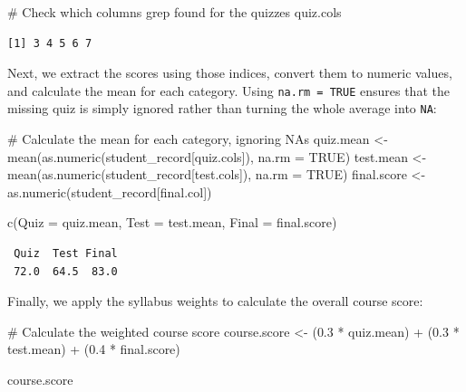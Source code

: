 \documentclass[
  letterpaper,
  DIV=11,
  numbers=noendperiod]{scrreprt}
\newenvironment{Shaded}{\begin{snugshade}}{\end{snugshade}}
\newcommand{\AttributeTok}[1]{\textcolor[rgb]{0.40,0.45,0.13}{#1}}
\newcommand{\CommentTok}[1]{\textcolor[rgb]{0.37,0.37,0.37}{#1}}
\newcommand{\ConstantTok}[1]{\textcolor[rgb]{0.56,0.35,0.01}{#1}}
\newcommand{\FloatTok}[1]{\textcolor[rgb]{0.68,0.00,0.00}{#1}}
\newcommand{\FunctionTok}[1]{\textcolor[rgb]{0.28,0.35,0.67}{#1}}
\newcommand{\NormalTok}[1]{\textcolor[rgb]{0.00,0.23,0.31}{#1}}
\newcommand{\OtherTok}[1]{\textcolor[rgb]{0.00,0.23,0.31}{#1}}
\newcommand{\SpecialCharTok}[1]{\textcolor[rgb]{0.37,0.37,0.37}{#1}}
\begin{document}
\begin{Shaded}
\begin{Highlighting}[]
\CommentTok{\# Check which columns grep found for the quizzes}
\NormalTok{quiz.cols}
\end{Highlighting}
\end{Shaded}

\begin{verbatim}
[1] 3 4 5 6 7
\end{verbatim}

Next, we extract the scores using those indices, convert them to numeric
values, and calculate the mean for each category. Using
\texttt{na.rm\ =\ TRUE} ensures that the missing quiz is simply ignored
rather than turning the whole average into \texttt{NA}:

\begin{Shaded}
\begin{Highlighting}[]
\CommentTok{\# Calculate the mean for each category, ignoring NAs}
\NormalTok{quiz.mean }\OtherTok{\textless{}{-}} \FunctionTok{mean}\NormalTok{(}\FunctionTok{as.numeric}\NormalTok{(student\_record[quiz.cols]), }\AttributeTok{na.rm =} \ConstantTok{TRUE}\NormalTok{)}
\NormalTok{test.mean }\OtherTok{\textless{}{-}} \FunctionTok{mean}\NormalTok{(}\FunctionTok{as.numeric}\NormalTok{(student\_record[test.cols]), }\AttributeTok{na.rm =} \ConstantTok{TRUE}\NormalTok{)}
\NormalTok{final.score }\OtherTok{\textless{}{-}} \FunctionTok{as.numeric}\NormalTok{(student\_record[final.col])}

\FunctionTok{c}\NormalTok{(}\AttributeTok{Quiz =}\NormalTok{ quiz.mean, }\AttributeTok{Test =}\NormalTok{ test.mean, }\AttributeTok{Final =}\NormalTok{ final.score)}
\end{Highlighting}
\end{Shaded}

\begin{verbatim}
 Quiz  Test Final 
 72.0  64.5  83.0 
\end{verbatim}

Finally, we apply the syllabus weights to calculate the overall course
score:

\begin{Shaded}
\begin{Highlighting}[]
\CommentTok{\# Calculate the weighted course score}
\NormalTok{course.score }\OtherTok{\textless{}{-}}\NormalTok{ (}\FloatTok{0.3} \SpecialCharTok{*}\NormalTok{ quiz.mean) }\SpecialCharTok{+}\NormalTok{ (}\FloatTok{0.3} \SpecialCharTok{*}\NormalTok{ test.mean) }\SpecialCharTok{+}\NormalTok{ (}\FloatTok{0.4} \SpecialCharTok{*}\NormalTok{ final.score)}

\NormalTok{course.score}
\end{Highlighting}
\end{Shaded}
\end{document}
